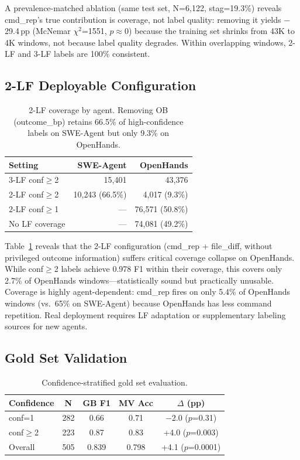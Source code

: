 \documentclass[11pt,a4paper]{article}
\begin{document}
A prevalence-matched ablation (same test set, N=6{,}122, stag=19.3\%) reveals cmd\_rep's true contribution is coverage, not label quality: removing it yields $-$29.4\,pp (McNemar $\chi^2$=1551, $p\approx 0$) because the training set shrinks from 43K to 4K windows, not because label quality degrades.
Within overlapping windows, 2-LF and 3-LF labels are 100\% consistent.

\subsection{2-LF Deployable Configuration}
\label{sec:2lf}

\begin{table}[t]
\centering
\small
\begin{tabular}{lrr}
\toprule
\textbf{Setting} & \textbf{SWE-Agent} & \textbf{OpenHands} \\
\midrule
3-LF conf$\geq$2 & 15{,}401 & 43{,}376 \\
2-LF conf$\geq$2 & 10{,}243 (66.5\%) & 4{,}017 (9.3\%) \\
2-LF conf$\geq$1 & --- & 76{,}571 (50.8\%) \\
No LF coverage & --- & 74{,}081 (49.2\%) \\
\bottomrule
\end{tabular}
\caption{2-LF coverage by agent. Removing OB (outcome\_bp) retains 66.5\% of high-confidence labels on SWE-Agent but only 9.3\% on OpenHands.}
\label{tab:2lf}
\end{table}

Table~\ref{tab:2lf} reveals that the 2-LF configuration (cmd\_rep + file\_diff, without privileged outcome information) suffers critical coverage collapse on OpenHands.
While conf$\geq$2 labels achieve 0.978 F1 within their coverage, this covers only 2.7\% of OpenHands windows---statistically sound but practically unusable.
Coverage is highly agent-dependent: cmd\_rep fires on only 5.4\% of OpenHands windows (vs.\ 65\% on SWE-Agent) because OpenHands has less command repetition.
Real deployment requires LF adaptation or supplementary labeling sources for new agents.

\subsection{Gold Set Validation}
\label{sec:gold}

\begin{table}[t]
\centering
\small
\begin{tabular}{lcccc}
\toprule
\textbf{Confidence} & \textbf{N} & \textbf{GB F1} & \textbf{MV Acc} & \textbf{$\Delta$ (pp)} \\
\midrule
conf=1 & 282 & 0.66 & 0.71 & $-$2.0 ($p$=0.31) \\
conf$\geq$2 & 223 & 0.87 & 0.83 & +4.0 ($p$=0.003) \\
Overall & 505 & 0.839 & 0.798 & +4.1 ($p$=0.0001) \\
\bottomrule
\end{tabular}
\caption{Confidence-stratified gold set evaluation.}
\label{tab:gold-stratified}
\end{table}
\end{document}
